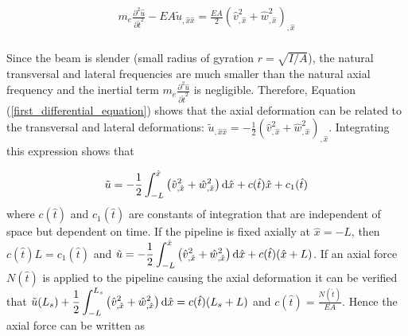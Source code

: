 \documentclass[3p,doublespacing,authoryear,11pt]{elsarticle} %
\begin{document}
  \begin{equation}\label{first_differential_equation}
  \begin{array}{l } 
  \displaystyle  m_e  \frac{\partial^2 \hat{u}}{\partial \hat{t}^2}  - E A \tilde{u}_{,\hat{x}\hat{x}}=  \frac{E A }{2} \left( \hat{v}_{,\hat{x}}^2 + \hat{w}_{,\hat{x}}^2 \right)_{,\hat{x}} \\  
  \end{array}  
\end{equation}

Since the beam is slender (small radius of gyration $r = \sqrt{I/A}$), the natural transversal and lateral frequencies are much smaller than the natural axial frequency and the inertial term $m_e \frac{\partial^2 \hat{u}}{\partial \hat{t}^2}$ is negligible. Therefore, Equation (\ref{first_differential_equation}) shows that the axial deformation can be related to the transversal and lateral deformations: $\tilde{u}_{,\hat{x}\hat{x}}=  - \frac{1}{2} \left( \hat{v}_{,\hat{x}}^2 + \hat{w}_{,\hat{x}}^2 \right)_{,\hat{x}} $. Integrating this expression shows that 

  \begin{equation}\label{Integrating_axial_Displ_0}
  \begin{array}{l } 
  \displaystyle  \tilde{u} = -  \frac{1}{2} \int_{-L}^{\hat{x}} \left( \hat{v}_{,\hat{x}}^2 + \hat{w}_{,\hat{x}}^2 \right) \textup{d} \hat{x} + c(\hat{t}) \hat{x} + c_1(\hat{t}) \\  
  \end{array}  
\end{equation}
where $c(\hat{t})$ and $c_1(\hat{t})$ are constants of integration that are independent of space but dependent on time. If the pipeline is fixed axially at $\hat{x}=-L$, then $c(\hat{t}) L =  c_1(\hat{t})$ and $  \displaystyle\tilde{u} = -  \frac{1}{2} \int_{-L}^{\hat{x}} \left( \hat{v}_{,\hat{x}}^2 + \hat{w}_{,\hat{x}}^2 \right) \textup{d} \hat{x} + c(\hat{t}) (\hat{x} + L)$. If an axial force $N(\hat{t})$ is applied to the pipeline causing the axial deformation it can be verified that $  \displaystyle \tilde{u} (L_s) +  \frac{1}{2} \int_{-L}^{L_s} \left( \hat{v}_{,\hat{x}}^2 + \hat{w}_{,\hat{x}}^2 \right) \textup{d} \hat{x} = c(\hat{t}) (L_s+L)$ and $c(\hat{t}) =\frac{N(\hat{t})}{EA}$. Hence the axial force can be written as 
\end{document}
